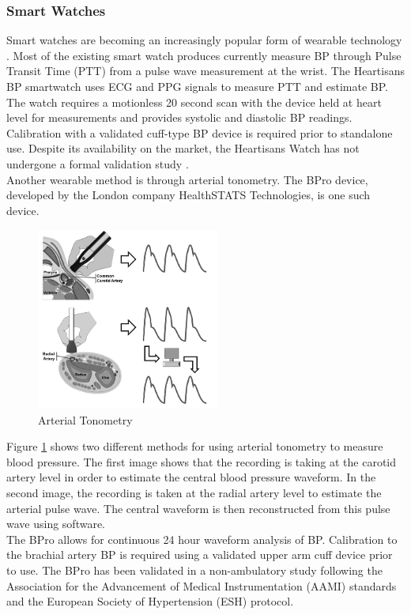 \subsubsection*{Smart Watches}
Smart watches are becoming an increasingly popular form of wearable technology \cite{Bard2019}. Most of the existing smart
 watch produces currently measure BP through Pulse Transit Time (PTT) from a pulse wave measurement at the wrist. The Heartisans 
 BP smartwatch uses ECG and PPG signals to measure PTT and estimate BP. The watch requires a motionless 20 second scan with 
 the device held at heart level for measurements and provides systolic and diastolic BP readings. Calibration with a
  validated cuff-type BP device is required prior to standalone use. Despite its availability on the market, the 
  Heartisans Watch has not undergone a formal validation study \cite{Bard2019}. \\ \newline \noindent Another wearable 
  method  is  through  arterial  tonometry. The BPro device, developed by the London company HealthSTATS Technologies, 
  is one such device.
\begin{figure}[H]
    \centering
    \includegraphics[width=6cm,height=6cm,keepaspectratio]{Background/arterial.png}
    \caption{Arterial Tonometry}
    \label{tonometry}
\end{figure} \noindent Figure \ref{tonometry} shows two different methods for using arterial 
tonometry to measure blood pressure. The first image shows that the recording is taking at the carotid 
artery level in order to estimate the central blood pressure waveform. In the second image, the recording 
is taken at the radial artery level to estimate the arterial pulse wave. The central waveform is then 
reconstructed from this pulse wave using software. \\ \newline \noindent The BPro allows for continuous  24 hour 
 waveform  analysis  of  BP. Calibration to the brachial artery BP is required using a validated upper arm cuff 
 device prior to use. The BPro has been validated in a non-ambulatory study following the Association for the 
 Advancement of Medical Instrumentation (AAMI) standards and the European Society of Hypertension (ESH) protocol.

